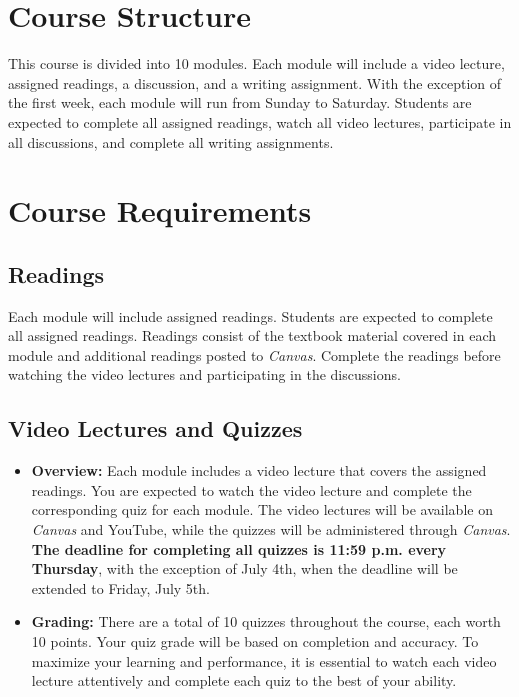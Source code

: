 \documentclass[12pt, letterpaper]{article}
\begin{document}
\section{Course Structure}

This course is divided into 10 modules. Each module will include a video lecture, assigned readings, a discussion, and a writing assignment. With the exception of the first week, each module will run from Sunday to Saturday. Students are expected to complete all assigned readings, watch all video lectures, participate in all discussions, and complete all writing assignments.

\section*{Course Requirements}

\subsection*{Readings}

Each module will include assigned readings. Students are expected to complete all assigned readings. Readings consist of the textbook material covered in each module and additional readings posted to \emph{Canvas}. Complete the readings before watching the video lectures and participating in the discussions.

\subsection*{Video Lectures and Quizzes}
\begin{itemize}
    \item \textbf{Overview:} Each module includes a video lecture that covers the assigned readings. You are expected to watch the video lecture and complete the corresponding quiz for each module. The video lectures will be available on \emph{Canvas} and YouTube, while the quizzes will be administered through \emph{Canvas}. \textbf{The deadline for completing all quizzes is 11:59 p.m. every Thursday}, with the exception of July 4th, when the deadline will be extended to Friday, July 5th.
    \item \textbf{Grading:} There are a total of 10 quizzes throughout the course, each worth 10 points. Your quiz grade will be based on completion and accuracy. To maximize your learning and performance, it is essential to watch each video lecture attentively and complete each quiz to the best of your ability.
\end{itemize}
\end{document}
